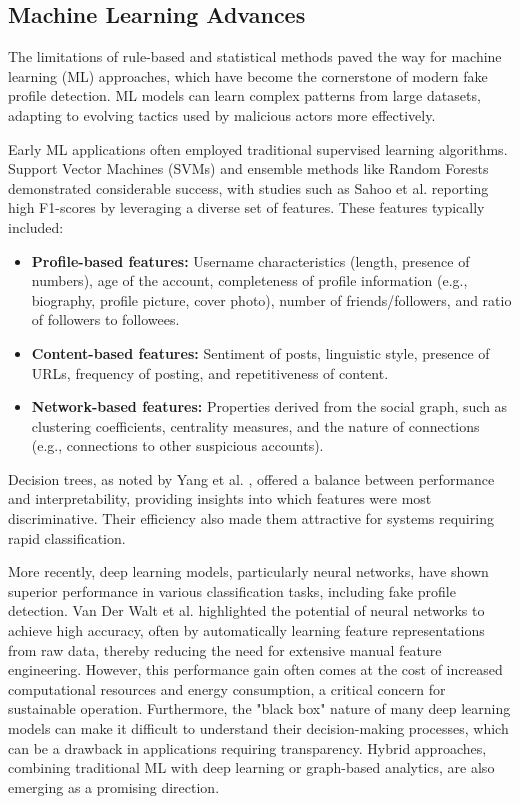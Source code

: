 \documentclass[conference]{IEEEtran}
\begin{document}
\subsection{Machine Learning Advances}
The limitations of rule-based and statistical methods paved the way for machine learning (ML) approaches, which have become the cornerstone of modern fake profile detection. ML models can learn complex patterns from large datasets, adapting to evolving tactics used by malicious actors more effectively.

Early ML applications often employed traditional supervised learning algorithms. Support Vector Machines (SVMs) and ensemble methods like Random Forests demonstrated considerable success, with studies such as Sahoo et al. \cite{b3} reporting high F1-scores by leveraging a diverse set of features. These features typically included:
\begin{itemize}
    \item \textbf{Profile-based features:} Username characteristics (length, presence of numbers), age of the account, completeness of profile information (e.g., biography, profile picture, cover photo), number of friends/followers, and ratio of followers to followees.
    \item \textbf{Content-based features:} Sentiment of posts, linguistic style, presence of URLs, frequency of posting, and repetitiveness of content.
    \item \textbf{Network-based features:} Properties derived from the social graph, such as clustering coefficients, centrality measures, and the nature of connections (e.g., connections to other suspicious accounts).
\end{itemize}
Decision trees, as noted by Yang et al. \cite{b7}, offered a balance between performance and interpretability, providing insights into which features were most discriminative. Their efficiency also made them attractive for systems requiring rapid classification.

More recently, deep learning models, particularly neural networks, have shown superior performance in various classification tasks, including fake profile detection. Van Der Walt et al. \cite{b6} highlighted the potential of neural networks to achieve high accuracy, often by automatically learning feature representations from raw data, thereby reducing the need for extensive manual feature engineering. However, this performance gain often comes at the cost of increased computational resources and energy consumption, a critical concern for sustainable operation. Furthermore, the "black box" nature of many deep learning models can make it difficult to understand their decision-making processes, which can be a drawback in applications requiring transparency. Hybrid approaches, combining traditional ML with deep learning or graph-based analytics, are also emerging as a promising direction.
\end{document}
